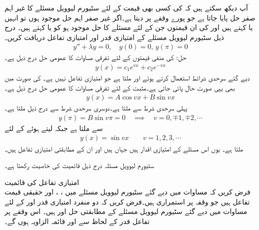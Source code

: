 آپ دیکھ سکتے ہیں کہ  کی کسی بھی قیمت کے لئے سٹیورم لیوویل مسئلے کا غیر اہم صفر حل  پایا جاتا ہے جو پورے وقفے پر  دیتا ہے۔اگر غیر صفر اہم حل   موجود ہوں تو انہیں  یا  کہتے ہیں اور  کی ان قیمتوں جن کے لئے مسئلے کا حل موجود ہو کو  یا  کہتے ہیں۔
درج ذیل سٹیورم لیوویل مسئلے کے امتیازی قدر اور امتیازی تفاعل دریافت کریں۔
\begin{align*}
y''+\lambda y=0,\quad y(0)=0,\, y(\pi)=0
\end{align*}
حل: کی منفی قیمتوں  کے لئے تفرقی مساوات کا عمومی حل درج ذیل ہے۔
\begin{align*}
y(x)=c_1e^{vx}+c_2e^{-vx}
\end{align*}
دیے گئے سرحدی شرائط استعمال کرتے ہوئے  اور  ملتا ہے جو امتیازی تفاعل نہیں ہے۔ کی صورت میں بھی یہی صورت حال پائی جاتی ہے۔مثبت  کے لئے تفرقی مساوات کا عمومی حل درج ذیل ہے۔
\begin{align*}
y(x)=A\cos vx+B\sin vx
\end{align*}
پہلی سرحدی شرط سے   ملتا ہے۔دوسری سرحدی شرط سے درج ذیل ملتا ہے۔
\begin{align*}
y(\pi)=B\sin v \pi=0 \quad \implies \quad v=0, \mp1, \mp2,\cdots
\end{align*}
 سے  ملتا ہے جبکہ  لیتے ہوئے  کے لئے 
\begin{align*}
y(x)=\sin vx\quad \quad v=1,2,3,\cdots
\end{align*}
ملتا ہے۔ یوں اس مسئلے کے امتیازی اقدار  ہیں جہاں  ہیں اور ان کے مطابقتی امتیازی تفاعل  ہیں۔
 

سٹیورم لیوویل مسئلہ  درج ذیل قائمیت کی خاصیت رکھتا ہے۔ 

\quad امتیازی تفاعل کی قائمیت\\
فرض کریں کہ مساوات  میں دیے گئے سٹیورم لیوویل مسئلے  میں  ، ،  اور   حقیقی قیمت تفاعل ہیں جو وقفہ  پر استمراری ہیں۔فرض کریں کہ دو منفرد امتیازی قدر  اور  کے لئے مساوات  میں دیے گئے سٹیورم لیوویل مسئلے  کے مطابقتی حل    اور   ہیں۔ اس وقفے پر تفاعل قدر  کے لحاظ سے  اور  قائمہ الزاویہ ہوں گے۔

